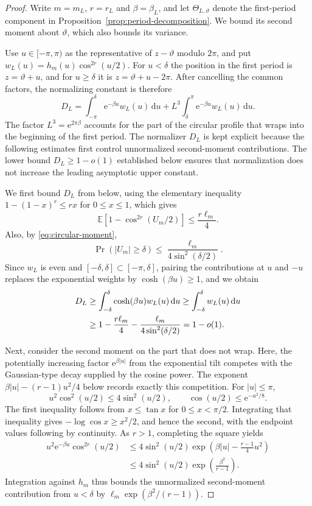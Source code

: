 \documentclass[10pt,a4paper]{amsart}
\newcommand{\E}{\mathbb E}
\newcommand{\dd}{\,\mathrm d}
\newcommand{\e}{\mathrm e}
\begin{document}
\begin{proof}
Write $m=m_L$, $r=r_L$ and $\beta=\beta_L$, and let $\Theta_{L,\vartheta}$ denote the first-period component in Proposition~\ref{prop:period-decomposition}. We bound its second moment about $\vartheta$, which also bounds its variance.

Use $u\in[-\pi,\pi)$ as the representative of $z-\vartheta$ modulo $2\pi$, and put $w_L(u)=h_m(u)\cos^{2r}(u/2)$. For $u<\delta$ the position in the first period is $z=\vartheta+u$, and for $u\geq\delta$ it is $z=\vartheta+u-2\pi$. After cancelling the common factors, the normalizing constant is therefore
\[
  D_L=\int_{-\pi}^{\delta}\e^{-\beta u}w_L(u)\dd u
        +L^3\int_{\delta}^{\pi}\e^{-\beta u}w_L(u)\dd u.
\]
The factor $L^3=\e^{2\pi\beta}$ accounts for the part of the circular profile that wraps into the beginning of the first period. The normalizer $D_L$ is kept explicit because the following estimates first control unnormalized second-moment contributions. The lower bound $D_L\geq1-o(1)$ established below ensures that normalization does not increase the leading asymptotic upper constant.

We first bound $D_L$ from below, using the elementary inequality $1-(1-x)^r\leq rx$ for $0\leq x\leq1$, which gives
\[
  \E\!\left[1-\cos^{2r}(U_m/2)\right]\leq\frac{r\ell_m}{4}.
\]
Also, by \eqref{eq:circular-moment},
\[
  \Pr(|U_m|\geq\delta)
  \leq\frac{\ell_m}{4\sin^2(\delta/2)}.
\]
Since $w_L$ is even and $[-\delta,\delta]\subset[-\pi,\delta]$, pairing the contributions at $u$ and $-u$ replaces the exponential weights by $\cosh(\beta u)\geq1$, and we obtain
\begin{align}
  D_L
  &\geq\int_{-\delta}^{\delta}\cosh(\beta u)w_L(u)\dd u
   \geq\int_{-\delta}^{\delta}w_L(u)\dd u \notag\\
  &\geq1-\frac{r\ell_m}{4}
          -\frac{\ell_m}{4\sin^2(\delta/2)}
   =1-o(1).
  \label{eq:normalizer-bound}
\end{align}

Next, consider the second moment on the part that does not wrap. Here, the potentially increasing factor $\e^{\beta|u|}$ from the exponential tilt competes with the Gaussian-type decay supplied by the cosine power. The exponent $\beta|u|-(r-1)u^2/4$ below records exactly this competition. For $|u|\leq\pi$,
\begin{equation}\label{eq:elementary-cosine-bounds}
  u^2\cos^2(u/2)\leq4\sin^2(u/2),
  \qquad
  \cos(u/2)\leq\e^{-u^2/8}.
\end{equation}
The first inequality follows from $x\leq\tan x$ for $0\leq x<\pi/2$. Integrating that inequality gives $-\log\cos x\geq x^2/2$, and hence the second, with the endpoint values following by continuity. As $r>1$, completing the square yields
\begin{align*}
  u^2\e^{-\beta u}\cos^{2r}(u/2)
  &\leq4\sin^2(u/2)
      \exp\!\left(\beta|u|-\frac{r-1}{4}u^2\right)\\
  &\leq4\sin^2(u/2)\exp\!\left(\frac{\beta^2}{r-1}\right).
\end{align*}
Integration against $h_m$ thus bounds the unnormalized second-moment contribution from $u<\delta$ by $\ell_m\exp(\beta^2/(r-1))$.


\end{proof}
\end{document}

